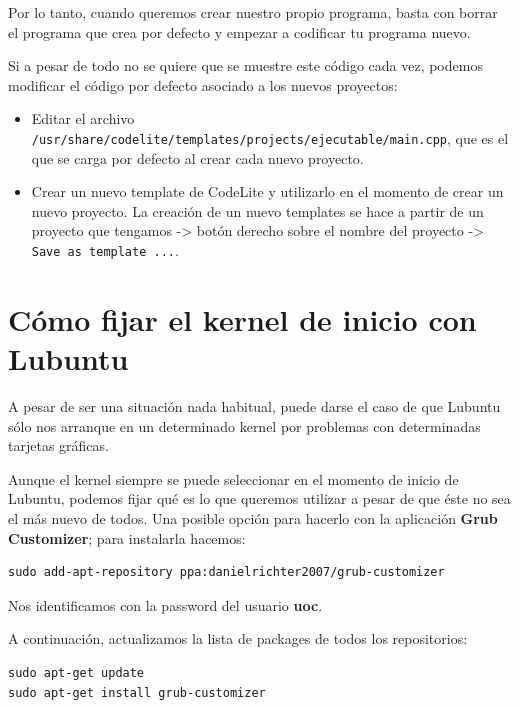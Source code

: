 \documentclass[
]{book}
\providecommand{\tightlist}{%
  \setlength{\itemsep}{0pt}\setlength{\parskip}{0pt}}
\begin{document}
Por lo tanto, cuando queremos crear nuestro propio programa, basta con borrar el programa que crea por defecto y empezar a codificar tu programa nuevo.

Si a pesar de todo no se quiere que se muestre este código cada vez, podemos modificar el código por defecto asociado a los nuevos proyectos:

\begin{itemize}
\tightlist
\item
  Editar el archivo \texttt{/usr/share/codelite/templates/projects/ejecutable/main.cpp}, que es el que se carga por defecto al crear cada nuevo proyecto.
\item
  Crear un nuevo template de CodeLite y utilizarlo en el momento de crear un nuevo proyecto. La creación de un nuevo templates se hace a partir de un proyecto que tengamos -\textgreater{} botón derecho sobre el nombre del proyecto -\textgreater{} \texttt{Save\ as\ template\ ...}.
\end{itemize}

\hypertarget{cuxf3mo-fijar-el-kernel-de-inicio-con-lubuntu}{%
\section{Cómo fijar el kernel de inicio con Lubuntu}\label{cuxf3mo-fijar-el-kernel-de-inicio-con-lubuntu}}

A pesar de ser una situación nada habitual, puede darse el caso de que Lubuntu sólo nos arranque en un determinado kernel por problemas con determinadas tarjetas gráficas.

Aunque el kernel siempre se puede seleccionar en el momento de inicio de Lubuntu, podemos fijar qué es lo que queremos utilizar a pesar de que éste no sea el más nuevo de todos. Una posible opción para hacerlo con la aplicación \textbf{Grub Customizer}; para instalarla hacemos:

\begin{verbatim}
sudo add-apt-repository ppa:danielrichter2007/grub-customizer
\end{verbatim}

Nos identificamos con la password del usuario \textbf{uoc}.

A continuación, actualizamos la lista de packages de todos los repositorios:

\begin{verbatim}
sudo apt-get update
sudo apt-get install grub-customizer
\end{verbatim}
\end{document}

